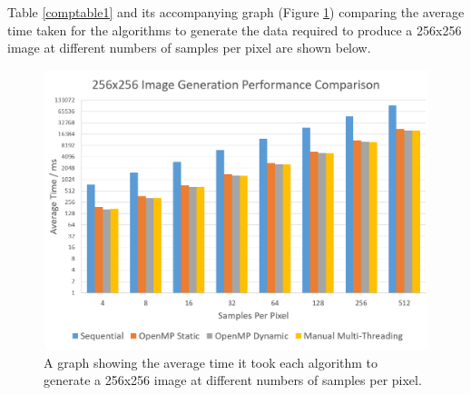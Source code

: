 \documentclass[12pt,journal,transmag]{IEEEtran}
\begin{document}
	Table \ref{comptable1} and its accompanying graph (Figure \ref{graph1}) comparing the average time taken for the algorithms to generate the data required to produce a 256x256 image at different numbers of samples per pixel are shown below.
	
	\begin{table}[!h]
		\caption{256x256 Image Generation Performance Comparison}
		\label{comptable1}
		\centering
	\end{table}
	
	\begin{figure}[!h]
		\centering
		\includegraphics[width=\textwidth]{IMAGES/performancecomparison1}
		\caption{A graph showing the average time it took each algorithm to generate a 256x256 image at different numbers of samples per pixel.}
		\label{graph1}
	\end{figure}
	
\end{document}
